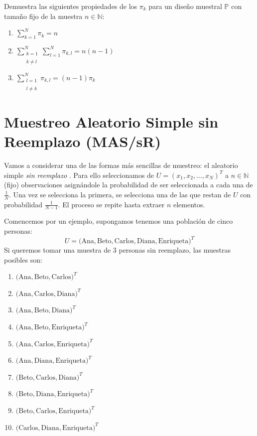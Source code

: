 \documentclass[
]{book}
\begin{document}
Demuestra las siguientes propiedades de los \(\pi_k\) para un diseño muestral \(\mathbb{P}\) con tamaño fijo de la muestra \(n\in\mathbb{N}\):

\begin{enumerate}
\def\labelenumi{\arabic{enumi}.}
\item
  \(\sum\limits_{k=1}^N \pi_k = n\)
\item
  \(\sum\limits_{\substack{k=1 \\\\ k \neq l}}^N \sum\limits_{l=1}^N \pi_{k,l} = n(n-1)\)
\item
  \(\sum\limits_{\substack{l=1 \\\\ l \neq k}}^N \pi_{k,l} = (n-1) \pi_k\)
\end{enumerate}

\hypertarget{muestreo-aleatorio-simple-sin-reemplazo-massr}{%
\section{Muestreo Aleatorio Simple sin Reemplazo (MAS/sR)}\label{muestreo-aleatorio-simple-sin-reemplazo-massr}}

Vamos a considerar una de las formas más sencillas de muestreo: el aleatorio simple \emph{sin reemplazo} . Para ello seleccionamos de \(U = (x_1, x_2, \dots, x_N)^T\) a \(n\in\mathbb{N}\) (fijo) observaciones asignándole la probabilidad de ser seleccionada a cada una de \(\frac{1}{N}\). Una vez se selecciona la primera, se selecciona una de las que restan de \(U\) con probabilidad \(\frac{1}{N-1}\). El proceso se repite hasta extraer \(n\) elementos.

Comencemos por un ejemplo, supongamos tenemos una población de cinco personas:
\[
U = \Big( \text{Ana}, \text{Beto}, \text{Carlos}, \text{Diana}, \text{Enriqueta}\Big)^T
\]
Si queremos tomar una muestra de \(3\) personas sin reemplazo, las muestras posibles son:

\begin{enumerate}
\def\labelenumi{\arabic{enumi}.}
\item
  \(\Big( \text{Ana}, \text{Beto}, \text{Carlos}\Big)^T\)
\item
  \(\Big( \text{Ana}, \text{Carlos}, \text{Diana}\Big)^T\)
\item
  \(\Big( \text{Ana}, \text{Beto}, \text{Diana}\Big)^T\)
\item
  \(\Big( \text{Ana}, \text{Beto}, \text{Enriqueta}\Big)^T\)
\item
  \(\Big( \text{Ana}, \text{Carlos}, \text{Enriqueta}\Big)^T\)
\item
  \(\Big( \text{Ana}, \text{Diana}, \text{Enriqueta}\Big)^T\)
\item
  \(\Big( \text{Beto}, \text{Carlos}, \text{Diana}\Big)^T\)
\item
  \(\Big( \text{Beto}, \text{Diana}, \text{Enriqueta}\Big)^T\)
\item
  \(\Big( \text{Beto}, \text{Carlos}, \text{Enriqueta}\Big)^T\)
\item
  \(\Big( \text{Carlos}, \text{Diana}, \text{Enriqueta}\Big)^T\)
\end{enumerate}
\end{document}
